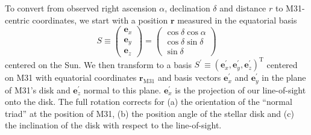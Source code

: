 \documentclass[preprint]{aastex}
\begin{document}
\label{sect:coords}

To convert from observed right ascension $\alpha$, declination $\delta$ and distance $r$ to M31-centric coordinates, we start with a position $\mathbf{r}$ measured in the equatorial basis
\begin{equation}
    S \equiv \left ( \begin{array}{c}
        \mathbf{e}_x \\ \mathbf{e}_y \\ \mathbf{e}_z
    \end{array} \right ) = \left ( \begin{array}{c}
        \cos \delta \cos \alpha \\
        \cos \delta \sin \delta \\
        \sin \delta
    \end{array} \right )
\end{equation}
centered on the Sun.  We then transform to a basis $S^\prime \equiv (\mathbf{e}_x^\prime, \mathbf{e}_y^\prime,\mathbf{e}_z^\prime)^\mathrm{T}$ centered on M31 with equatorial coordinates $\mathbf{r}_\mathrm{M31}$ and basis vectors $\mathbf{e}_x^\prime$ and $\mathbf{e}_y^\prime$ in the plane of M31's disk and $\mathbf{e}_z^\prime$ normal to this plane.  $\mathbf{e}_x^\prime$ is the projection of our line-of-sight onto the disk.  The full rotation corrects for (a) the orientation of the ``normal triad'' at the position of M31, (b) the position angle of the stellar disk and (c) the inclination of the disk with respect to the line-of-sight.
\end{document}
